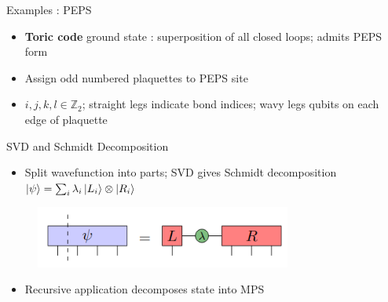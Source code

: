 \documentclass{beamer}
\begin{document}
\begin{frame}{Examples : PEPS}
	\begin{itemize}
	\item \textbf{Toric code} ground state : superposition of all closed loops; admits PEPS form
	\end{itemize}
\begin{itemize}
\begin{itemize}
	\item Assign odd numbered plaquettes to PEPS site
\item ${ i,j,k,l \in \mathbb{Z}_{2} }$; straight legs indicate bond indices; wavy legs qubits on each edge of plaquette
\end{itemize}
\end{itemize}	
\end{frame}

\begin{frame}{SVD and Schmidt Decomposition}
	\begin{itemize}
	\item Split wavefunction into parts; SVD gives Schmidt decomposition ${ \ket{\psi }=\sum_{i}^{} \lambda _{i}\ket{L_{i}}\otimes \ket{R_{i}} }$
	\end{itemize}
		\begin{figure}[h]
		\includegraphics[width=0.75\textwidth]{schmidt}
		\centering
		\end{figure}
		\begin{itemize}
		\item Recursive application decomposes state into MPS
		\end{itemize}
\end{frame}
\end{document}
